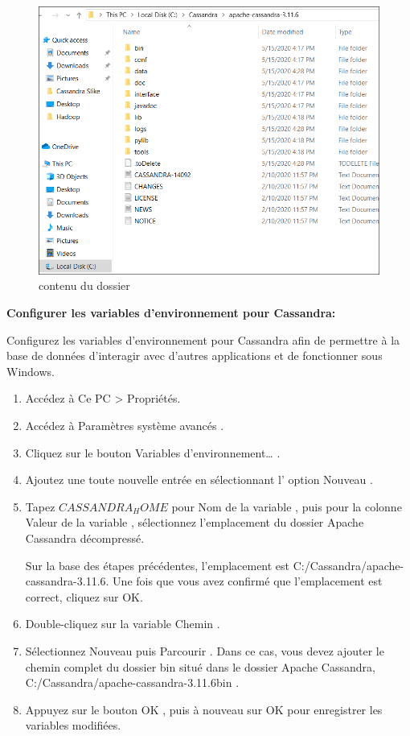 \begin{enumerate}
\begin{figure}[h]
	\centering
    \includegraphics[scale=0.5]{img/part3/2.4}
    \caption{contenu du dossier}
\end{figure}
\end{enumerate}

\textbf{Configurer les variables d'environnement pour Cassandra:}

Configurez les variables d'environnement pour Cassandra afin de permettre à la base de données d'interagir avec d'autres applications et de fonctionner sous Windows.

\begin{enumerate}
\item Accédez à Ce PC > Propriétés.
\item Accédez à Paramètres système avancés .
\item Cliquez sur le bouton Variables d'environnement… .
\item Ajoutez une toute nouvelle entrée en sélectionnant l' option Nouveau .
\item Tapez $CASSANDRA_HOME$ pour Nom de la variable , puis pour la colonne Valeur de la variable , sélectionnez l'emplacement du  dossier Apache Cassandra décompressé.

Sur la base des étapes précédentes, l'emplacement est C:/Cassandra/apache-cassandra-3.11.6. Une fois que vous avez confirmé que l'emplacement est correct, cliquez sur OK.
\item Double-cliquez sur la variable Chemin .
\item Sélectionnez Nouveau puis Parcourir . Dans ce cas, vous devez ajouter le chemin complet du  dossier bin situé dans le dossier Apache Cassandra, C:/Cassandra/apache-cassandra-3.11.6bin .
\item Appuyez sur le bouton OK , puis à nouveau sur OK pour enregistrer les variables modifiées.
\end{enumerate}